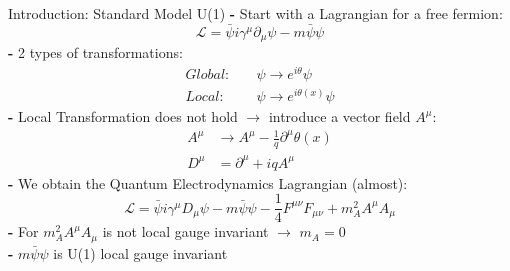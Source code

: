 \documentclass[pdf, 9pt]{beamer}
\begin{document}

  \begin{frame}{Introduction: Standard Model U(1)}
    \textbf{-} Start with a Lagrangian for a free fermion:\\
    \begin{equation}
      \label{eq:higgs_introduction_diracLagrangian}
      \mathcal{L} = \bar{\psi}i\gamma^{\mu}\partial_{\mu}\psi - m\bar{\psi}\psi
    \end{equation}
    \textbf{-} 2 types of transformations:\\\vspace{-0.3cm}
    \begin{subequations}\label{grp}
    \begin{align}
      Global:&\quad \psi \rightarrow e^{i\theta}\psi\\
      Local:&\quad \psi \rightarrow e^{i\theta(x)}\psi\label{eq:higgs_introduction_localgauge}
    \end{align}
    \end{subequations}
    \textbf{-} Local Transformation does not hold $\rightarrow$ introduce a vector field $A^{\mu}$:
    \begin{subequations}\label{eq:higgs_introduction_qedgauge}
    \begin{align}
      A^{\mu}& \rightarrow A^{\mu} - \frac{1}{q}\partial^{\mu}\theta(x)\label{eq:higgs_introduction_photonfieldu1}\\
      D^{\mu}& = \partial^{\mu} + iqA^{\mu}\label{eq:higgs_introduction_covariantderivative}
    \end{align}
    \end{subequations}
    \textbf{-} We obtain the Quantum Electrodynamics Lagrangian (almost):\\
    \begin{equation}
      \label{eq:higgs_introduction_diracLagrangianwithvectormass}
      \mathcal{L} = \bar{\psi}i\gamma^{\mu}D_{\mu}\psi - m\bar{\psi}\psi - \frac{1}{4}F^{\mu\nu}F_{\mu\nu} + m_{A}^{2}A^{\mu}A_{\mu}
    \end{equation}
    \textbf{-} \alert{For $m_{A}^{2}A^{\mu}A_{\mu}$ is not local gauge invariant $\rightarrow$ $m_{A} = 0$}\\
    \textbf{-} \alert{$m\bar{\psi}\psi$ is U(1) local gauge invariant}
  \end{frame}
\end{document}

